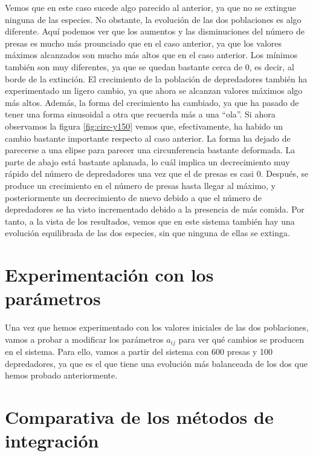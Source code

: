 \documentclass[11pt,a4paper]{article}
\begin{document}
Vemos que en este caso sucede algo parecido al anterior, ya que no se extingue ninguna de las especies.
No obstante, la evolución de las dos poblaciones es algo diferente. Aquí podemos ver que los aumentos
y las disminuciones del número de presas es mucho más prounciado que en el caso anterior, ya que los
valores máximos alcanzados son mucho más altos que en el caso anterior. Los mínimos también son muy diferentes,
ya que se quedan bastante cerca de 0, es decir, al borde de la extinción. El crecimiento de la población
de depredadores también ha experimentado un ligero cambio, ya que ahora se alcanzan valores máximos algo
más altos. Además, la forma del crecimiento ha cambiado, ya que ha pasado de tener una forma sinusoidal a otra
que recuerda más a una ``ola''. Si ahora observamos la figura \ref{fig:circ-y150} vemos que, efectivamente, ha
habido un cambio bastante importante respecto al caso anterior. La forma ha dejado de parecerse a una elipse para
parecer una circunferencia bastante deformada. La parte de abajo está bastante aplanada, lo cuál implica
un decrecimiento muy rápido del número de depredadores una vez que el de presas es casi 0. Después, se produce
un crecimiento en el número de presas hasta llegar al máximo, y posteriormente un decrecimiento de nuevo debido
a que el número de depredadores se ha visto incrementado debido a la presencia de más comida. Por tanto, a la vista
de los resultados, vemos que en este sistema también hay una evolución equilibrada de las dos especies, sin que
ninguna de ellas se extinga.

\section{Experimentación con los parámetros}

Una vez que hemos experimentado con los valores iniciales de las dos poblaciones, vamos
a probar a modificar los parámetros $a_{ij}$ para ver qué cambios se producen en el sistema.
Para ello, vamos a partir del sistema con 600 presas y 100 depredadores, ya que es el que tiene
una evolución más balanceada de los dos que hemos probado anteriormente.

\section{Comparativa de los métodos de integración}
\end{document}
